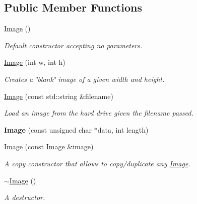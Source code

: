 \subsection*{Public Member Functions}
\begin{DoxyCompactItemize}
\item 
\mbox{\label{classImage_a58edd1c45b4faeb5f789b0d036d02313}} 
\hyperlink{classImage_a58edd1c45b4faeb5f789b0d036d02313}{Image} ()
\begin{DoxyCompactList}\small\item\em Default constructor accepting no parameters. \end{DoxyCompactList}\item 
\hyperlink{classImage_a05c964ca59502cc32c30e8ab89b5e920}{Image} (int w, int h)
\begin{DoxyCompactList}\small\item\em Creates a \char`\"{}blank\char`\"{} image of a given width and height. \end{DoxyCompactList}\item 
\hyperlink{classImage_a81e88caba6ef6c0ed639bf1f25e9d441}{Image} (const std\+::string \&filename)
\begin{DoxyCompactList}\small\item\em Load an image from the hard drive given the filename passed. \end{DoxyCompactList}\item 
\mbox{\label{classImage_a7f515a9c20a88c2010a5ace21c263925}} 
{\bfseries Image} (const unsigned char $\ast$data, int length)
\item 
\hyperlink{classImage_a34410a36b132ab597a8878d45facc89a}{Image} (const \hyperlink{classImage}{Image} \&image)
\begin{DoxyCompactList}\small\item\em A copy constructor that allows to copy/duplicate any \hyperlink{classImage}{Image}. \end{DoxyCompactList}\item 
\mbox{\label{classImage_a0294f63700543e11c0f0da85601c7ae5}} 
\hyperlink{classImage_a0294f63700543e11c0f0da85601c7ae5}{$\sim$\+Image} ()
\begin{DoxyCompactList}\small\item\em A destructor. \end{DoxyCompactList}\item 

\end{DoxyCompactItemize}
